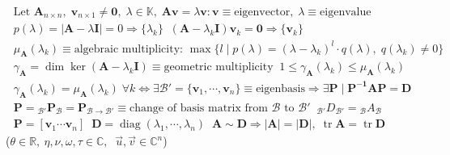 \begin{align*}
&\text{Let }\mathbf{A}_{n\times n},\;\mathbf{v}_{n\times1}\!\neq\!\mathbf{0},\;\lambda\!\in\!\mathbb{K},\;\mathbf{Av}\!=\!\lambda\mathbf{v}:\mathbf{v}\!\equiv\!\text{eigenvector},\;\lambda\!\equiv\!\text{eigenvalue} \\
&p(\lambda)\!=\!|\mathbf{A}\!-\!\lambda\mathbf{I}|\!=\!0\Rightarrow\{\lambda_k\}\;\;(\mathbf{A}\!-\!\lambda_k\mathbf{I})\mathbf{v}_k\!=\!\mathbf{0}\Rightarrow\{\mathbf{v}_k\} \\
&\mu_{\mathbf{A}}(\lambda_k)\!\equiv\!\text{algebraic multiplicity: }\max\{l\;|\;p(\lambda)\!=\!(\lambda\!-\!\lambda_k)^l\!\cdot\!q(\lambda),\;q(\lambda_k)\!\neq\!0\} \\
&\gamma_{\mathbf{A}}\!=\!\dim\ker(\mathbf{A}\!-\!\lambda_k\mathbf{I})\!\equiv\!\text{geometric multiplicity}\;\;1\!\leq\!\gamma_{\mathbf{A}}(\lambda_k)\!\leq\!\mu_\mathbf{A}(\lambda_k) \\
 &\gamma_{\mathbf{A}}(\lambda_k)\!=\!\mu_{\mathbf{A}}(\lambda_k)\;\forall k\Leftrightarrow\exists\mathcal{B'}\!=\!\{\mathbf{v}_1,\cdots,\mathbf{v}_n\}\!\equiv\!\text{eigenbasis}\Rightarrow\exists\mathbf{P}\;|\;\mathbf{P^{-1}AP}\!=\!\mathbf{D} \\
&\mathbf{P}\!=\!{}_{\mathcal{B'\!}}\mathbf{P}_{\mathcal{B}}\!=\!\mathbf{P}_{\mathcal{B\rightarrow B'}}\!\equiv\!\text{change of basis matrix from $\mathcal{B}$ to $\mathcal{B'}$}\;\;{}_{\mathcal{B}'}D_{\mathcal{B}'}\!=\!{}_{\mathcal{B}}A_{\mathcal{B}} \\
&\mathbf{P}\!=\![\mathbf{v}_1\cdots\mathbf{v}_n]\;\;\mathbf{D}\!=\!\operatorname{diag}(\lambda_1,\cdots,\lambda_n)\;\;\mathbf{A\!\sim\! D}\Rightarrow|\mathbf{A}|\!=\!|\mathbf{D}|,\;\operatorname{tr}\mathbf{A}\!=\!\operatorname{tr}\mathbf{D}\end{align*}
 \underline{} {\normalfont\scriptsize \ ($\theta \in \mathbb{R},\ \eta, \nu, \omega, \tau \in \mathbb{C}, \; \; \vec{u},\vec{v}\!\in\!\mathbb{C}^n$)}
